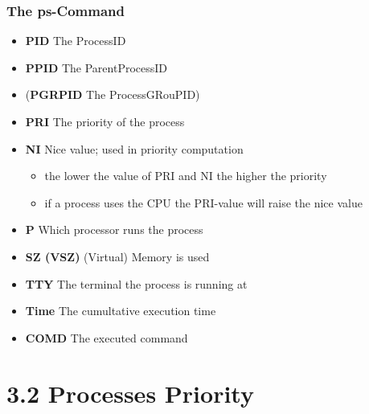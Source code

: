\documentclass[hyperref={pdfpagelabels=false}]{beamer}
\begin{document}
        \begin{frame}
            \frametitle{The ps-Command}
            \begin{itemize}
                \item<1-> \textbf{PID} The ProcessID
                \item<2-> \textbf{PPID} The ParentProcessID
                \item<2-> (\textbf{PGRPID} The ProcessGRouPID)
                \item<3-> \textbf{PRI} The priority of the process
                \item<4-> \textbf{NI} Nice value; used in priority computation 
                \begin{itemize}
                    \item<4-> the lower the value of PRI and NI the higher the priority
                    \item<5-> if a process uses the CPU the PRI-value will raise the nice value
                \end{itemize}
                \item<6-> \textbf{P} Which processor runs the process 
                \item<7-> \textbf{SZ (VSZ)} (Virtual) Memory is used 
                \item<8-> \textbf{TTY} The terminal the process is running at
                \item<9-> \textbf{Time} The cumultative execution time
                \item<10-> \textbf{COMD} The executed command
            \end{itemize}
        \end{frame}
\section{3.2 Processes Priority}
\end{document}
